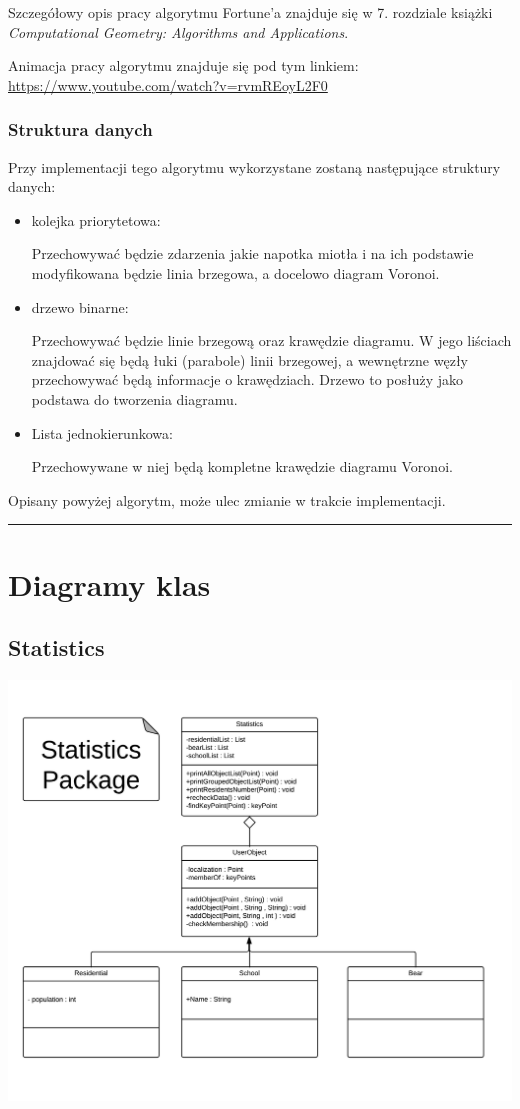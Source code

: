 \documentclass[a4paper,11pt]{article}
\newcommand{\linia}{\rule{\linewidth}{0.4mm}}
\begin{document}
Szczegółowy opis pracy algorytmu Fortune'a znajduje się w 7. rozdziale książki \textit{Computational Geometry: Algorithms and Applications}.

Animacja pracy algorytmu znajduje się pod tym linkiem: \url{https://www.youtube.com/watch?v=rvmREoyL2F0}{}

\subsubsection{Struktura danych}
Przy implementacji tego algorytmu wykorzystane zostaną następujące struktury danych:
\begin{itemize}
\item kolejka priorytetowa:

Przechowywać będzie zdarzenia jakie napotka miotła i na ich podstawie modyfikowana będzie linia brzegowa, a docelowo diagram Voronoi.
\item drzewo binarne:

Przechowywać będzie linie brzegową oraz krawędzie diagramu. W jego liściach znajdować się będą łuki (parabole) linii brzegowej, a wewnętrzne węzły przechowywać będą informacje o krawędziach. Drzewo to posłuży jako podstawa do tworzenia diagramu.
\item Lista jednokierunkowa:

Przechowywane w niej będą kompletne krawędzie diagramu Voronoi.
\end{itemize}

Opisany powyżej algorytm, może ulec zmianie w trakcie implementacji.

\noindent\linia
\section{Diagramy klas}
\subsection{Statistics}
\includegraphics[scale=0.28]{statisticPackage.png} 
\end{document}
